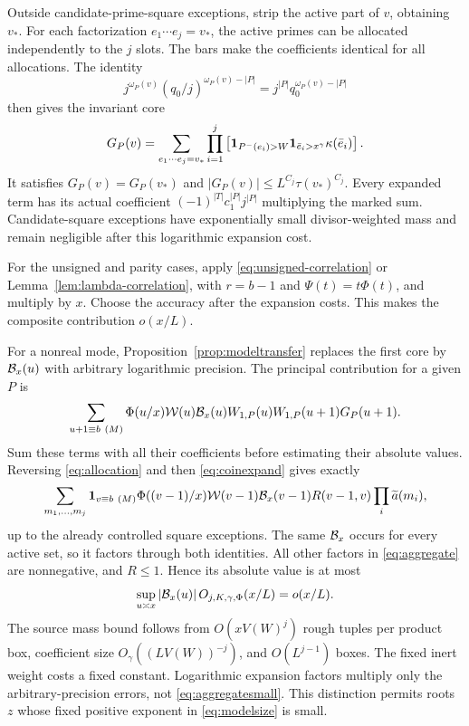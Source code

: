Outside candidate-prime-square exceptions, strip the active part
of $v$, obtaining $v_*$. For each factorization $e_1\cdots e_j=v_*$,
the active primes can be allocated independently to the $j$ slots.
The bars make the coefficients identical for all allocations.
The identity
\begin{equation}\label{eq:allocation}
 j^{\omega_P(v)}(q_0/j)^{\omega_P(v)-|P|}
       =j^{|P|}q_0^{\omega_P(v)-|P|}
\end{equation}
then gives the invariant core
\[
 G_P(v)=\sum_{e_1\cdots e_j=v_*}
 \prod_{i=1}^j\left[
  \mathbf 1_{P^-(e_i)>W}\mathbf 1_{\bar e_i>x^\gamma}\kappa(\bar e_i)\right].
\]
It satisfies $G_P(v)=G_P(v_*)$ and
$|G_P(v)|\leq L^{C_j}\tau(v_*)^{C_j}$.
Every expanded term has its actual coefficient
$(-1)^{|T|}c_1^{|P|}j^{|P|}$ multiplying the marked sum.
Candidate-square exceptions have exponentially small divisor-weighted
mass and remain negligible after this logarithmic expansion cost.

For the unsigned and parity cases, apply
\eqref{eq:unsigned-correlation} or
Lemma~\ref{lem:lambda-correlation}, with $r=b-1$ and
$\Psi(t)=t\Phi(t)$, and multiply by $x$.
Choose the accuracy after the expansion costs. This makes the
composite contribution $o(x/L)$.

For a nonreal mode, Proposition~\ref{prop:modeltransfer} replaces
the first core by $\mathcal B_x(u)$ with arbitrary logarithmic precision.
The principal contribution for a given $P$ is
\[
 \sum_{u+1\equiv b\ (M)}\Phi(u/x)\W(u)\Bx(u)
                W_{1,P}(u)W_{1,P}(u+1)G_P(u+1).
\]
Sum these terms with all their coefficients before estimating their
absolute values. Reversing \eqref{eq:allocation} and then
\eqref{eq:coinexpand} gives exactly
\begin{equation}\label{eq:aggregate}
 \sum_{m_1,\ldots,m_j}
 \mathbf 1_{v\equiv b\ (M)}\Phi((v-1)/x)\mathcal W(v-1)\mathcal B_x(v-1)
       R(v-1,v)\prod_i\widetilde a(m_i),
\end{equation}
up to the already controlled square exceptions.
The same $\mathcal B_x$ occurs for every active set, so it factors through
both identities. All other factors in \eqref{eq:aggregate} are
nonnegative, and $R\leq1$. Hence its absolute value is at most
\begin{equation}\label{eq:aggregatesmall}
 \sup_{u\asymp x}|\mathcal B_x(u)|\,O_{j,K,\gamma,\Phi}(x/L)=o(x/L).
\end{equation}
The source mass bound follows from $O(xV(W)^j)$ rough tuples per
product box, coefficient size $O_\gamma((LV(W))^{-j})$, and
$O(L^{j-1})$ boxes. The fixed inert weight costs a fixed constant.
Logarithmic expansion factors multiply only the arbitrary-precision
errors, not \eqref{eq:aggregatesmall}. This distinction permits roots
$z$ whose fixed positive exponent in \eqref{eq:modelsize} is small.

